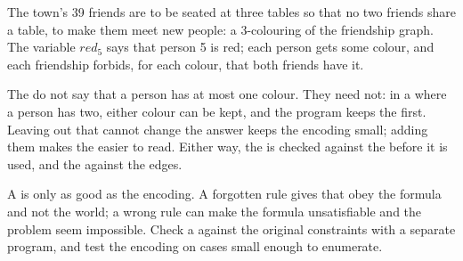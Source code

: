 The town's 39 friends are to be seated at three tables so that no two friends share a table, to make them meet new
people: a 3-colouring of the friendship graph. The variable $\mathit{red}_5$ says that person 5 is red; each person
gets some colour, and each friendship forbids, for each colour, that both friends have it.

\label{lst:b1:propositional-logic:colouring}

\label{out:b1:propositional-logic:colouring}

\begin{omfigure}
\begin{tikzpicture}[scale=0.82]

\end{tikzpicture}
\par{}
\end{omfigure}

The  do not say that a person has at most one colour. They need not: in a  where a person has two, either
colour can be kept, and the program keeps the first. Leaving out  that cannot change the answer keeps the
encoding small; adding them makes the  easier to read. Either way, the  is checked against the  before
it is used, and the  against the edges.

\begin{safety}
A  is only as good as the encoding. A forgotten rule gives  that obey the formula and not the world; a wrong
rule can make the formula unsatisfiable and the problem seem impossible. Check a  against the original
constraints with a separate program, and test the encoding on cases small enough to enumerate.
\end{safety}


